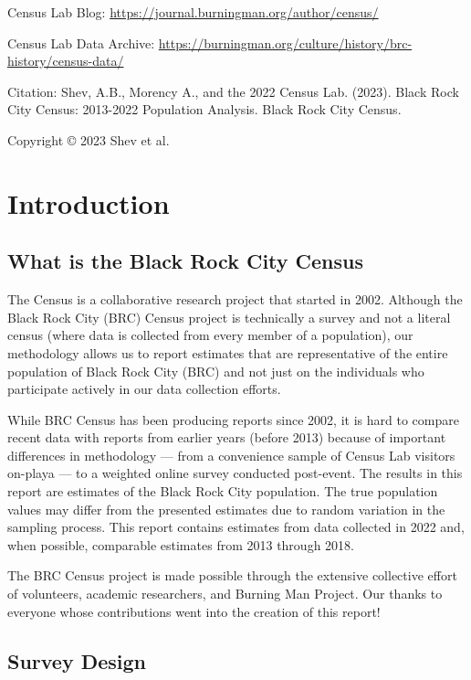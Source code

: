 \documentclass[
]{book}
\begin{document}
Census Lab Blog: \url{https://journal.burningman.org/author/census/}

Census Lab Data Archive: \url{https://burningman.org/culture/history/brc-history/census-data/}

Citation: Shev, A.B., Morency A., and the 2022 Census Lab. (2023). Black Rock City Census: 2013-2022 Population Analysis. Black Rock City Census.

Copyright © 2023 Shev et al.~

\hypertarget{introduction}{%
\chapter{Introduction}\label{introduction}}

\hypertarget{what-is-the-black-rock-city-census}{%
\section{What is the Black Rock City Census}\label{what-is-the-black-rock-city-census}}

The Census is a collaborative research project that started in 2002. Although
the Black Rock City (BRC) Census project is technically a survey and not a
literal census (where data is collected from every member of a population),
our methodology allows us to report estimates that are representative of the
entire population of Black Rock City (BRC) and not just on the individuals who
participate actively in our data collection efforts.

While BRC Census has been producing reports since 2002, it is hard to compare
recent data with reports from earlier years (before 2013) because of important
differences in methodology --- from a convenience sample of Census Lab
visitors on-playa --- to a weighted online survey conducted post-event.
The results in this report are estimates of the Black Rock City population.
The true population values may differ from the presented estimates due to random
variation in the sampling process. This report contains estimates from data
collected in 2022 and, when possible, comparable estimates from 2013 through
2018.

The BRC Census project is made possible through the extensive collective effort
of volunteers, academic researchers, and Burning Man Project. Our thanks to
everyone whose contributions went into the creation of this report!

\hypertarget{survey-design}{%
\section{Survey Design}\label{survey-design}}
\end{document}
